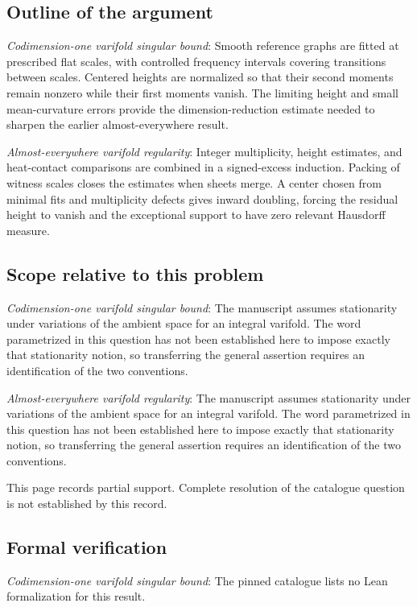\documentclass[11pt]{article}
\begin{document}
\subsection{Outline of the argument}
\textit{Codimension-one varifold singular bound}: Smooth reference graphs are fitted at prescribed flat scales, with controlled frequency intervals covering transitions between scales. Centered heights are normalized so that their second moments remain nonzero while their first moments vanish. The limiting height and small mean-curvature errors provide the dimension-reduction estimate needed to sharpen the earlier almost-everywhere result.

\textit{Almost-everywhere varifold regularity}: Integer multiplicity, height estimates, and heat-contact comparisons are combined in a signed-excess induction. Packing of witness scales closes the estimates when sheets merge. A center chosen from minimal fits and multiplicity defects gives inward doubling, forcing the residual height to vanish and the exceptional support to have zero relevant Hausdorff measure.

\subsection{Scope relative to this problem}
\textit{Codimension-one varifold singular bound}: The manuscript assumes stationarity under variations of the ambient space for an integral varifold. The word parametrized in this question has not been established here to impose exactly that stationarity notion, so transferring the general assertion requires an identification of the two conventions.

\textit{Almost-everywhere varifold regularity}: The manuscript assumes stationarity under variations of the ambient space for an integral varifold. The word parametrized in this question has not been established here to impose exactly that stationarity notion, so transferring the general assertion requires an identification of the two conventions.

This page records partial support. Complete resolution of the catalogue question is not established by this record.

\subsection{Formal verification}
\textit{Codimension-one varifold singular bound}: The pinned catalogue lists no Lean formalization for this result.
\end{document}
